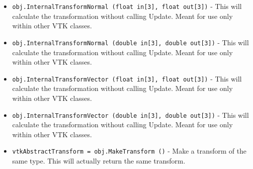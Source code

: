\begin{itemize}
\item  \verb|obj.InternalTransformNormal (float in[3], float out[3])| -  This will calculate the transformation without calling Update.
 Meant for use only within other VTK classes.

\item  \verb|obj.InternalTransformNormal (double in[3], double out[3])| -  This will calculate the transformation without calling Update.
 Meant for use only within other VTK classes.

\item  \verb|obj.InternalTransformVector (float in[3], float out[3])| -  This will calculate the transformation without calling Update.
 Meant for use only within other VTK classes.

\item  \verb|obj.InternalTransformVector (double in[3], double out[3])| -  This will calculate the transformation without calling Update.
 Meant for use only within other VTK classes.

\item  \verb|vtkAbstractTransform = obj.MakeTransform ()| -  Make a transform of the same type.  This will actually
 return the same transform.

\end{itemize}
